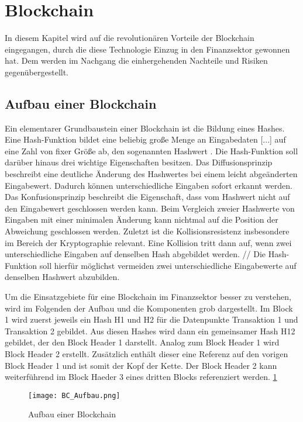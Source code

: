 \section{Blockchain}
In diesem Kapitel wird auf die revolutionären Vorteile der Blockchain 
eingegangen, durch die diese Technologie Einzug in den Finanzsektor gewonnen 
hat. Dem werden im Nachgang die einhergehenden Nachteile und Risiken gegenübergestellt. 

\subsection{Aufbau einer Blockchain}
Ein elementarer Grundbaustein einer Blockchain ist die Bildung eines Hashes.
\glqq Eine Hash-Funktion bildet eine beliebig große Menge an Eingabedaten [...] auf eine Zahl von 
fixer Größe ab, den sogenannten Hashwert\grqq{} \cite[p.~6]{fill2020blockchain}.
Die Hash-Funktion soll darüber hinaus drei wichtige Eigenschaften besitzen.
Das Diffusionsprinzip beschreibt eine deutliche Änderung des Hashwertes bei einem leicht
abgeänderten Eingabewert. Dadurch können unterschiedliche Eingaben sofort erkannt werden.
Das Konfusionsprinzip beschreibt die Eigenschaft, dass vom Hashwert nicht auf den Eingabewert
geschlossen werden kann. Beim Vergleich zweier Hashwerte von Eingaben mit einer minimalen
Änderung kann nichtmal auf die Position der Abweichung geschlossen werden.
Zuletzt ist die Kollisionsresistenz insbesondere im Bereich der Kryptographie relevant.
Eine Kollision tritt dann auf, wenn zwei unterschiedliche Eingaben auf denselben Hash abgebildet
werden. // Die Hash-Funktion soll hierfür möglichst vermeiden zwei unterschiedliche Eingabewerte
auf denselben Hashwert abzubilden.
\cite[p.~6ff]{fill2020blockchain} 

Um die Einsatzgebiete für eine Blockchain im Finanzsektor besser zu verstehen,
wird im Folgenden der Aufbau und die Komponenten grob dargestellt.
Im Block 1 wird zuerst jeweils ein Hash H1 und H2 für die Datenpunkte Transaktion 1 
und Transaktion 2 gebildet. Aus diesen Hashes wird dann ein gemeinsamer Hash H12 gebildet, 
der den Block Header 1 darstellt.
Analog zum Block Header 1 wird Block Header 2 erstellt. Zusätzlich enthält dieser eine
Referenz auf den vorigen Block Header 1 und ist somit der Kopf der Kette. Der Block Header 2
kann weiterführend im Block Haeder 3 eines dritten Blocks referenziert werden. 
\ref{fig:BC_Aufbau}
\cite[p.~17f]{fill2020blockchain}

\begin{figure}[h!]
    \texttt{[image: BC\_Aufbau.png]}
    \caption{Aufbau einer Blockchain \cite[p.~19]{fill2020blockchain}}
    \label{fig:BC_Aufbau}
\end{figure}

\subsection{}